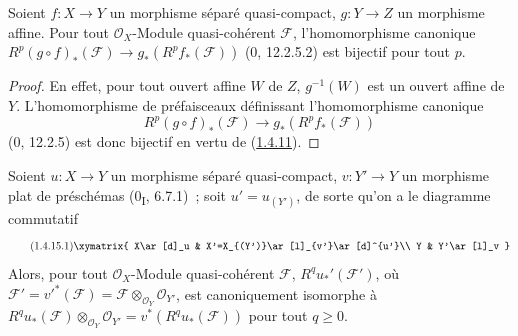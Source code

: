 \begin{proposition}[1.4.14]
\label{III.1.4.14-fr}
Soient $f:X\to Y$ un morphisme séparé quasi-compact, $g:Y\to Z$ un
morphisme affine. Pour tout $\mathcal O_X$-Module quasi-cohérent
$\mathcal F$, l'homomorphisme canonique
$R^p(g\circ f)_*(\mathcal F)\to g_*(R^pf_*(\mathcal F))$ (0, 12.2.5.2) est
bijectif pour tout $p$.
\end{proposition}

\begin{proof}
En effet, pour tout ouvert affine $W$ de $Z$, $g^{-1}(W)$ est un ouvert
affine de $Y$. L'homomorphisme de préfaisceaux définissant l'homomorphisme
canonique
\[
R^p(g\circ f)_*(\mathcal F)\longrightarrow g_*(R^pf_*(\mathcal F))
\]
(0, 12.2.5) est donc bijectif en vertu de
(\hyperref[III.1.4.11-fr]{1.4.11}).
\end{proof}

\begin{proposition}[1.4.15]
\label{III.1.4.15-fr}
Soient $u:X\to Y$ un morphisme séparé quasi-compact, $v:Y'\to Y$ un
morphisme plat de préschémas (0\textsubscript{I}, 6.7.1)~; soit
$u'=u_{(Y')}$, de sorte qu'on a le diagramme commutatif
\begin{equation}
\label{III.1.4.15.1-fr}
\tag{1.4.15.1}
\xymatrix{
X\ar[d]_u & X'=X_{(Y')}\ar[l]_{v'}\ar[d]^{u'}\\
Y & Y'\ar[l]_v
}
\end{equation}
Alors, pour tout $\mathcal O_X$-Module quasi-cohérent $\mathcal F$,
$R^qu_*'(\mathcal F')$, où
$\mathcal F'=v'^*(\mathcal F)=\mathcal F\otimes_{\mathcal O_Y}\mathcal O_{Y'}$,
est canoniquement isomorphe à
$R^qu_*(\mathcal F)\otimes_{\mathcal O_Y}\mathcal O_{Y'}
=v^*(R^qu_*(\mathcal F))$ pour tout $q\geq0$.
\end{proposition}

